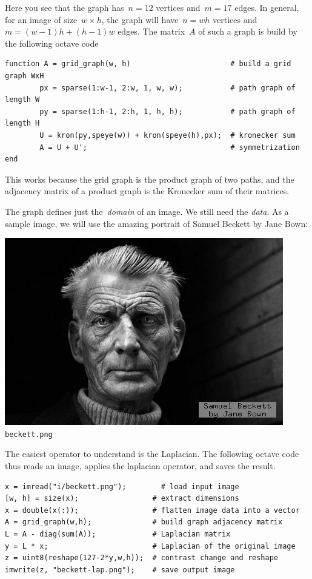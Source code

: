 Here you see that the graph has~$n=12$ vertices and~$m=17$ edges.
In general, for an image of size~$w\times h$, the graph will have~$n=wh$
vertices and~$m=(w-1)h+(h-1)w$ edges.  The matrix~$A$ of such a graph is
build by the following octave code

\begin{verbatim}
function A = grid_graph(w, h)                       # build a grid graph WxH
        px = sparse(1:w-1, 2:w, 1, w, w);           # path graph of length W
        py = sparse(1:h-1, 2:h, 1, h, h);           # path graph of length H
        U = kron(py,speye(w)) + kron(speye(h),px);  # kronecker sum
        A = U + U';                                 # symmetrization
end
\end{verbatim}

This works because the grid graph is the product graph of two paths, and the
adjacency matrix of a product graph is the Kronecker sum of their matrices.

The graph defines just the~\emph{domain} of an image.  We still need the
\emph{data}.  As a sample image, we will use the amazing portrait of Samuel
Beckett by Jane Bown:

\includegraphics{i/beckett.png}
\verb+beckett.png+

The easiest operator to understand is the Laplacian.  The following octave
code thus reads an image, applies the laplacian operator, and saves the
result.

\begin{verbatim}
x = imread("i/beckett.png");        # load input image
[w, h] = size(x);                 # extract dimensions
x = double(x(:));                 # flatten image data into a vector
A = grid_graph(w,h);              # build graph adjacency matrix
L = A - diag(sum(A));             # Laplacian matrix
y = L * x;                        # Laplacian of the original image
z = uint8(reshape(127-2*y,w,h));  # contrast change and reshape
imwrite(z, "beckett-lap.png");    # save output image
\end{verbatim}


